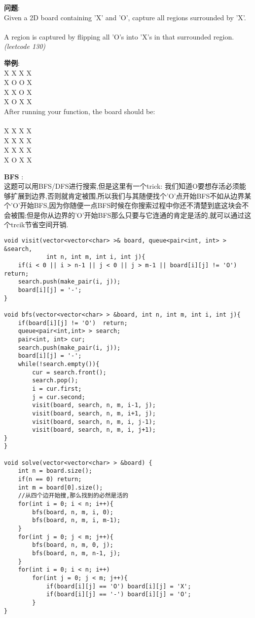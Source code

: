     
\begin{description}
    \item{\textbf{问题}}:\\
Given a 2D board containing 'X' and 'O', capture all regions surrounded by 'X'.\\
\\
A region is captured by flipping all 'O's into 'X's in that surrounded region.\\
\textit{(leetcode 130)}
    \item{\textbf{举例}}:\\
X X X X\\
X O O X\\
X X O X\\
X O X X\\
After running your function, the board should be:\\
\\
X X X X\\
X X X X\\
X X X X\\
X O X X\\
    \item{\textbf{BFS}} : 
    \\这题可以用BFS/DFS进行搜索,但是这里有一个trick: 我们知道O要想存活必须能够扩展到边界,否则就肯定被围,所以我们与其随便找个'O'点开始BFS不如从边界某个'O'开始BFS,因为你随便一点BFS时候在你搜索过程中你还不清楚到底这块会不会被围;但是你从边界的'O'开始BFS那么只要与它连通的肯定是活的,就可以通过这个trcik节省空间开销.
    \begin{lstlisting}
void visit(vector<vector<char> >& board, queue<pair<int, int> > &search, 
			int n, int m, int i, int j){
	if(i < 0 || i > n-1 || j < 0 || j > m-1 || board[i][j] != 'O')	return;
	search.push(make_pair(i, j));
	board[i][j] = '-';
}

void bfs(vector<vector<char> > &board, int n, int m, int i, int j){
	if(board[i][j] != 'O')	return;
	queue<pair<int,int> > search;
	pair<int, int> cur;
	search.push(make_pair(i, j));
	board[i][j] = '-';
	while(!search.empty()){
		cur = search.front();
		search.pop();
		i = cur.first;
		j = cur.second;
		visit(board, search, n, m, i-1, j);
		visit(board, search, n, m, i+1, j);
		visit(board, search, n, m, i, j-1);
		visit(board, search, n, m, i, j+1);
}
}

void solve(vector<vector<char> > &board) {
	int n = board.size();
	if(n == 0) return;
	int m = board[0].size();
	//从四个边开始搜,那么找到的必然是活的
	for(int i = 0; i < n; i++){
		bfs(board, n, m, i, 0);
		bfs(board, n, m, i, m-1);
	}
	for(int j = 0; j < m; j++){
		bfs(board, n, m, 0, j);
		bfs(board, n, m, n-1, j);
	}
	for(int i = 0; i < n; i++)
		for(int j = 0; j < m; j++){
			if(board[i][j] == 'O') board[i][j] = 'X';
			if(board[i][j] == '-') board[i][j] = 'O';
		}
}
    \end{lstlisting}
\end{description}
